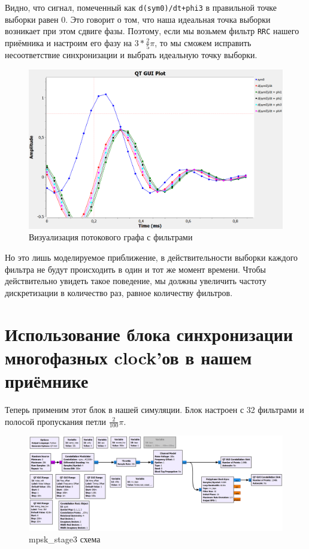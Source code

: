 \documentclass[a4paper,12pt]{report}
\begin{document}
Видно, что сигнал, помеченный как \texttt{d(sym0)/dt+phi3} в правильной точке выборки равен 0. Это говорит о том, что наша идеальная точка выборки возникает при этом сдвиге фазы. Поэтому, если мы возьмем фильтр \texttt{RRC} нашего приёмника и настроим его фазу на $3 * \frac{2}{5}\pi$, то мы сможем исправить несоответствие синхронизации и выбрать идеальную точку выборки.

\begin{figure}[H]
        \centering
        \includegraphics[width=1.0\textwidth]{lab12_fig3_9.png}
        \caption{Визуализация потокового графа с фильтрами}
        \label{fig:lab12_fig3_9}
\end{figure}

Но это лишь моделируемое приближение, в действительности выборки каждого фильтра не будут происходить в один и тот же момент времени. Чтобы действительно увидеть такое поведение, мы должны увеличить частоту дискретизации в количество раз, равное количеству фильтров.

\section{Использование блока синхронизации многофазных clock'ов в нашем приёмнике}

Теперь применим этот блок в нашей симуляции. Блок настроен с 32 фильтрами и полосой пропускания петли $\frac{2}{100}\pi$.

\begin{figure}[H]
        \centering
        \includegraphics[width=1.0\textwidth]{lab12_fig3_10.png}
        \caption{mpsk\_stage3 схема}
        \label{fig:lab12_fig3_10}
\end{figure}
\end{document}
